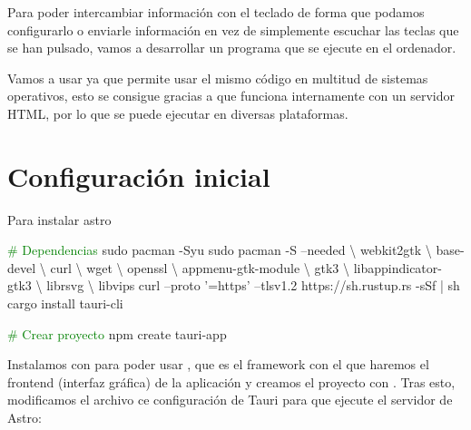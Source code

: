 Para poder intercambiar información con el teclado de forma que podamos configurarlo o enviarle información en vez de simplemente escuchar las teclas que se han pulsado, vamos a desarrollar un programa que se ejecute en el ordenador. 

Vamos a usar  ya que permite usar el mismo código en multitud de sistemas operativos, esto se consigue gracias a que funciona internamente con un servidor HTML, por lo que se puede ejecutar en diversas plataformas.

\section{Configuración inicial}
Para instalar astro
\begin{multicli}
    \textcolor{green}{\# Dependencias} \newline
    \cliarrow sudo pacman -Syu \newline
    \cliarrow sudo pacman -S --needed \textbackslash \newline
    \mytab webkit2gtk \textbackslash \newline
    \mytab base-devel \textbackslash \newline
    \mytab curl \textbackslash \newline
    \mytab wget \textbackslash \newline
    \mytab openssl \textbackslash \newline
    \mytab appmenu-gtk-module  \textbackslash \newline
    \mytab gtk3 \textbackslash \newline
    \mytab libappindicator-gtk3 \textbackslash \newline
    \mytab librsvg \textbackslash \newline
    \mytab libvips \newline
    \cliarrow curl --proto '=https' --tlsv1.2 https://sh.rustup.rs -sSf | sh \newline
    \cliarrow cargo install tauri-cli \newline

    \textcolor{green}{\# Crear proyecto} \newline
    \cliarrow npm create tauri-app
\end{multicli}

Instalamos  con  para poder usar , que es el framework con el que haremos el frontend (interfaz gráfica) de la aplicación y creamos el proyecto con . Tras esto, modificamos el archivo ce configuración de Tauri para que ejecute el servidor de Astro:


